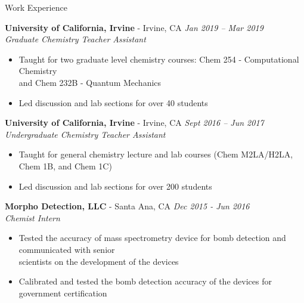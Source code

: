 \documentclass{resume} %
\begin{document}
\begin{rSection}{Work Experience}
  
  {\bf University of California, Irvine} - Irvine, CA \hfill {\em Jan 2019 -- Mar 2019} \\
  \textit{Graduate Chemistry Teacher Assistant}
  \vspace{-0.5em}
  \begin{itemize}
    \itemsep-0.5em
  \item Taught for two graduate level chemistry courses:
    Chem 254 - Computational Chemistry \\
    and Chem 232B - Quantum Mechanics
  \item Led discussion and lab sections for over 40 students
  \end{itemize}
\pagebreak
  {\bf University of California, Irvine} - Irvine, CA \hfill {\em Sept 2016 -- Jun 2017} \\
  \textit{Undergraduate Chemistry Teacher Assistant}
  \vspace{-0.5em}
  \begin{itemize}
  \itemsep-0.5em
  \item Taught for general chemistry lecture and lab courses (Chem M2LA/H2LA,
    Chem 1B, and Chem 1C)
  \item Led discussion and lab sections for over 200 students
  \end{itemize}
  
  {\bf Morpho Detection, LLC} - Santa Ana, CA \hfill {\em Dec 2015 - Jun 2016}  \\
  {\textit{Chemist Intern}}
  \vspace{-0.5em}
  \begin{itemize}
  \itemsep-0.75em
  \item Tested the accuracy of mass spectrometry device for bomb detection and communicated
    with senior\\
    scientists on the development of the devices
  \item Calibrated and tested the bomb detection accuracy of the devices for
    government certification
  \end{itemize}  

\end{rSection}
\end{document}
